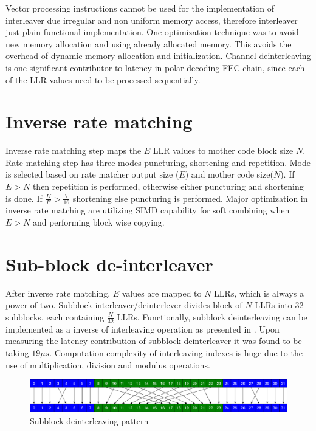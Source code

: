 Vector processing instructions cannot be used for the implementation of interleaver due irregular and non uniform memory access, therefore interleaver just plain functional implementation. One optimization technique was to avoid new memory allocation and using already allocated memory. This avoids the overhead of dynamic memory allocation and initialization. Channel deinterleaving is one significant contributor to latency in polar decoding FEC chain, since each of the LLR values need to be processed sequentially.

\section{Inverse rate matching}
Inverse rate matching step maps the $E$ LLR values to mother code block size $ N $. Rate matching step has three modes puncturing, shortening and repetition. Mode is selected based on rate matcher output size ($E$) and mother code size($ N $). If $E > N$ then repetition is performed, otherwise either puncturing and shortening is done. If $ \frac{K}{E} > \frac{7}{16} $ shortening else puncturing is performed. Major optimization in inverse rate matching are utilizing SIMD capability for soft combining when $ E>N $ and performing block wise copying. 
%
%
\section{Sub-block de-interleaver}
After inverse rate matching, $E$ values are mapped to $N$ LLRs, which is always a power of two. Subblock interleaver/deinterlever divides block of $N$ LLRs into $32$ subblocks, each containing $\frac{N}{32}$ LLRs. Functionally, subblock deinterleaving can be implemented as a inverse of interleaving operation as presented in \cite{3gpp.38.212}. Upon measuring the latency contribution of subblock deinterleaver it was found to be taking $19 \mu s$. Computation complexity of interleaving indexes is huge due to the use of multiplication, division and modulus operations. \newline

\begin{figure}[]
	\centering
	\includegraphics[width=1.0\textwidth]{./figures/subblockDeinterleaver.pdf}
	\caption{Subblock deinterleaving pattern}
	\label{fig:subblockDeinterleaver}
\end{figure}

